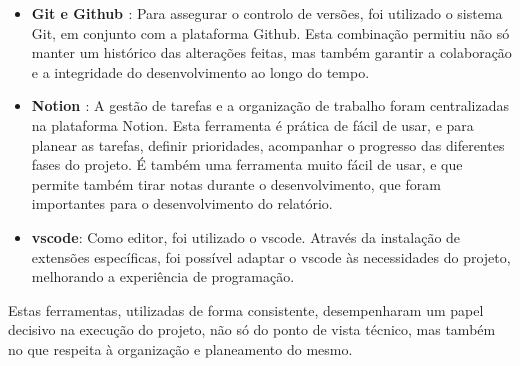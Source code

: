 \begin{itemize}
    \item \textbf{Git \cite{git} e Github \cite{github}}: Para assegurar o controlo de versões, foi utilizado o sistema Git, em conjunto com a plataforma Github. Esta combinação permitiu não só manter um histórico  das alterações feitas, mas também garantir a colaboração e a integridade do desenvolvimento ao longo do tempo.

    \item \textbf{Notion \cite{notion}}: A gestão de tarefas e a organização de trabalho foram centralizadas na plataforma Notion. Esta ferramenta é prática de fácil de usar, e para planear as tarefas, definir prioridades, acompanhar o progresso das diferentes fases do projeto. É também uma ferramenta muito fácil de usar, e que permite também tirar notas durante o desenvolvimento, que foram importantes para o desenvolvimento do relatório.

    \item \textbf{\gls{vscode}\cite{vscode}}: Como editor, foi utilizado o \gls{vscode}. Através da instalação de extensões específicas, foi possível adaptar o \gls{vscode} às necessidades do projeto, melhorando a experiência de programação.
\end{itemize}

Estas ferramentas, utilizadas de forma consistente, desempenharam um papel decisivo na execução do projeto, não só do ponto de vista técnico, mas também no que respeita à organização e planeamento do mesmo.
